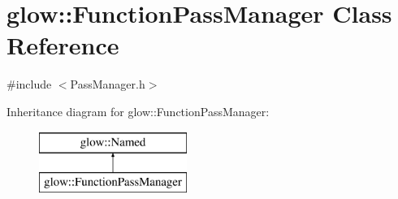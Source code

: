 \hypertarget{classglow_1_1_function_pass_manager}{}\section{glow\+:\+:Function\+Pass\+Manager Class Reference}
\label{classglow_1_1_function_pass_manager}


{\ttfamily \#include $<$Pass\+Manager.\+h$>$}

Inheritance diagram for glow\+:\+:Function\+Pass\+Manager\+:\begin{figure}[H]
\begin{center}
\leavevmode
\includegraphics[height=2.000000cm]{classglow_1_1_function_pass_manager}
\end{center}
\end{figure}
